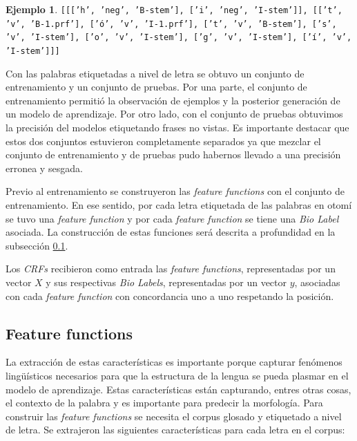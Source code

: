 \documentclass[letterpaper,12pt,oneside]{book}
\newcommand{\note}[4][]{\todo[author=#2,color=#3,size=\scriptsize,fancyline,caption={},#1]{#4}} %
\newcommand{\diego}[2][]{\note[#1]{Diego}{blue!40}{#2}}
\newcommand{\Diego}[2][]{\diego[inline,#1]{#2}\noindent}
\def\code#1{\texttt{#1}}
\theoremstyle{definition}
\newtheorem{exmp}{Ejemplo}[section]
\begin{document}
\begin{exmp} \label{exmp:frase_preproc}
    \code{[[['h', 'neg', 'B-stem'], ['i', 'neg', 'I-stem']], [['t', 'v', 'B-1.prf'],
          ['ó', 'v', 'I-1.prf'],
          ['t', 'v', 'B-stem'],
          ['s', 'v', 'I-stem'],
          ['o', 'v', 'I-stem'],
          ['g', 'v', 'I-stem'],
          ['í', 'v', 'I-stem']]]}
\end{exmp}{}
\Diego{Correccion del margen}

Con las palabras etiquetadas a nivel de letra se obtuvo un conjunto de entrenamiento y un conjunto de pruebas. Por una parte, el conjunto de entrenamiento permitió la observación de ejemplos y la posterior generación de un modelo de aprendizaje. Por otro lado, con el conjunto de pruebas obtuvimos la precisión del modelos etiquetando frases no vistas. Es importante destacar que estos dos conjuntos estuvieron completamente separados ya que mezclar el conjunto de entrenamiento y de pruebas pudo habernos llevado a una precisión erronea y sesgada.

Previo al entrenamiento se construyeron las \textit{feature functions} con el conjunto de entrenamiento. En ese sentido, por cada letra etiquetada de las palabras en otomí se tuvo una \textit{feature function} y por cada \textit{feature function} se tiene una \textit{Bio Label} asociada. La construcción de estas funciones será descrita a profundidad en la subsección \ref{subsec:feature}.


Los \textit{CRFs} recibieron como entrada las \textit{feature functions}, representadas por un vector $X$ y sus respectivas \textit{Bio Labels}, representadas por un vector $y$, asociadas con cada \textit{feature function} con concordancia uno a uno respetando la posición. 

\subsection{Feature functions} \label{subsec:feature}

La extracción de estas características es importante porque capturar fenómenos lingüísticos necesarios para que la estructura de la lengua se pueda plasmar en el modelo de aprendizaje. Estas características están capturando, entres otras cosas, el contexto de la palabra y es importante para predecir la morfología. Para construir las \textit{feature functions} se necesita el corpus glosado y etiquetado a nivel de letra. Se extrajeron las siguientes características para cada letra en el corpus:
\end{document}
